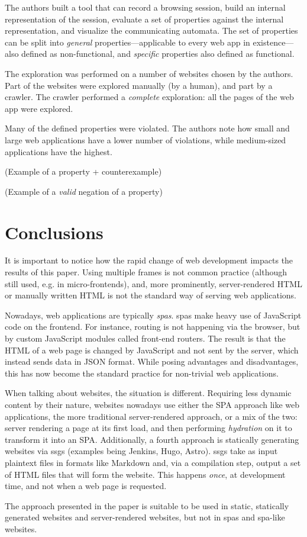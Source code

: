 \documentclass[a4paper,10pt]{article}
\theoremstyle{plain} %
\theoremstyle{definition}
\theoremstyle{remark}
\begin{document}
The authors built a tool that can record a browsing session, build an internal representation of the session, evaluate a set of properties against the internal representation, and visualize the communicating automata. The set of properties can be split into \textit{general} properties---applicable to every web app in existence---also defined as non-functional, and \textit{specific} properties also defined as functional.

The exploration was performed on a number of websites chosen by the authors. Part of the websites were explored manually (by a human), and part by a crawler. The crawler performed a \emph{complete} exploration: all the pages of the web app were explored.

Many of the defined properties were violated. The authors note how small and large web applications have a lower number of violations, while medium-sized applications have the highest.

(Example of a property + counterexample)

(Example of a \textit{valid} negation of a property)

\section{Conclusions}

It is important to notice how the rapid change of web development impacts the results of this paper. Using multiple frames is not common practice (although still used, e.g. in micro-frontends), and, more prominently, server-rendered HTML or manually written HTML is not the standard way of serving web applications.

Nowadays, web applications are typically \textit{\glspl{spa}}. \glspl{spa} make heavy use of JavaScript code on the frontend. For instance, routing is not happening via the browser, but by custom JavaScript modules called front-end routers.  The result is that the HTML of a web page is changed by JavaScript and not sent by the server, which instead sends data in JSON format. While posing advantages and disadvantages, this has now become the standard practice for non-trivial web applications.

When talking about websites, the situation is different. Requiring less dynamic content by their nature, websites nowadays use either the SPA approach like web applications, the more traditional server-rendered approach, or a mix of the two: server rendering a page at its first load, and then performing \emph{hydration} on it to transform it into an SPA. Additionally, a fourth approach is statically generating websites via \glspl{ssg} (examples being Jenkins\cite{JenkinsWeb}, Hugo\cite{HugoWeb}, Astro\cite{AstroWeb}). \glspl{ssg} take as input plaintext files in formats like Markdown and, via a compilation step, output a set of HTML files that will form the website. This happens \emph{once}, at development time, and not when a web page is requested.

The approach presented in the paper is suitable to be used in static, statically generated websites and server-rendered websites, but not in \acrlong{spa}s and \gls{spa}-like websites.


\clearpage
\printbibliography
\end{document}
